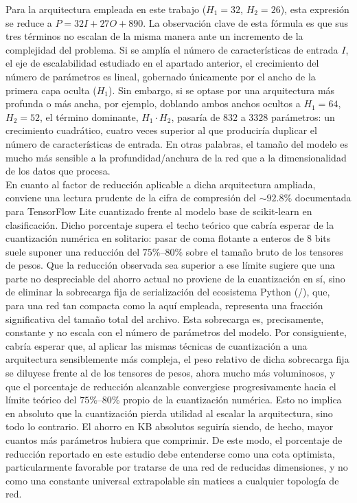 \documentclass[a4paper,12pt,twoside,final]{book}
\begin{document}
Para la arquitectura empleada en este trabajo ($H_1=32$, $H_2=26$), esta expresión se reduce a $P = 32I + 27O + 890$. La
observación clave de esta fórmula es que sus tres términos no escalan de la misma manera ante un incremento de la
complejidad del problema. Si se amplía el número de características de entrada $I$, el eje de escalabilidad estudiado en
el apartado anterior, el crecimiento del número de parámetros es lineal, gobernado únicamente por el ancho de la primera
capa oculta ($H_1$). Sin embargo, si se optase por una arquitectura más profunda o más ancha, por ejemplo, doblando
ambos anchos ocultos a $H_1=64$, $H_2=52$, el término dominante, $H_1 \cdot H_2$, pasaría de $832$ a $3328$ parámetros:
un crecimiento cuadrático, cuatro veces superior al que produciría duplicar el número de características de entrada. En
otras palabras, el tamaño del modelo es mucho más sensible a la profundidad/anchura de la red que a la dimensionalidad
de los datos que procesa.\\
 
En cuanto al factor de reducción aplicable a dicha arquitectura ampliada, conviene una lectura prudente de la cifra de
compresión del $\sim 92.8\%$ documentada para TensorFlow Lite cuantizado frente al modelo base de scikit-learn en
clasificación. Dicho porcentaje supera el techo teórico que cabría esperar de la cuantización numérica en solitario:
pasar de coma flotante a enteros de 8 bits suele suponer una reducción del $75\%$--$80\%$ sobre el tamaño bruto de los
tensores de pesos. Que la reducción observada sea superior a ese límite sugiere que una parte no despreciable del ahorro
actual no proviene de la cuantización en sí, sino de eliminar la sobrecarga fija de serialización del ecosistema Python
(/), que, para una red tan compacta como la aquí empleada, representa una fracción
significativa del tamaño total del archivo. Esta sobrecarga es, precisamente, constante y no escala con el número de
parámetros del modelo. Por consiguiente, cabría esperar que, al aplicar las mismas técnicas de cuantización a una
arquitectura sensiblemente más compleja, el peso relativo de dicha sobrecarga fija se diluyese frente al de los tensores
de pesos, ahora mucho más voluminosos, y que el porcentaje de reducción alcanzable convergiese progresivamente hacia el
límite teórico del $75\%$--$80\%$ propio de la cuantización numérica. Esto no implica en absoluto que la cuantización
pierda utilidad al escalar la arquitectura, sino todo lo contrario. El ahorro en KB absolutos seguiría siendo, de hecho,
mayor cuantos más parámetros hubiera que comprimir. De este modo, el porcentaje de reducción reportado en este estudio
debe entenderse como una cota optimista, particularmente favorable por tratarse de una red de reducidas dimensiones, y
no como una constante universal extrapolable sin matices a cualquier topología de red.
\end{document}
